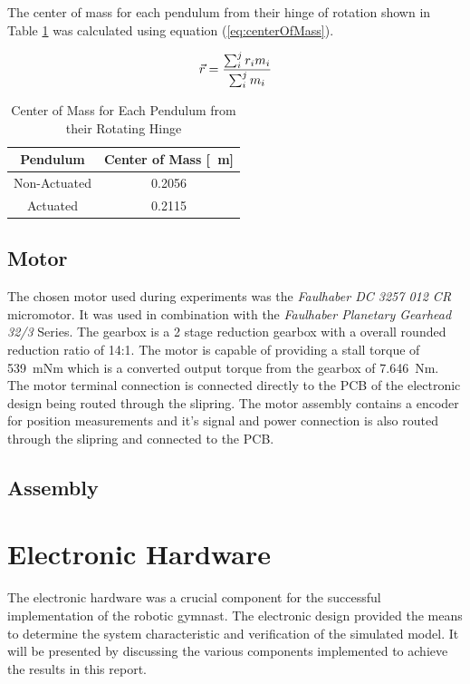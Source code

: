 The center of mass for each pendulum from their hinge of rotation shown in Table \ref{table:centerOfMass} was calculated using equation (\ref{eq:centerOfMass}).

\begin{equation} \label{eq:centerOfMass}
\vec{\boldmath{r}} = \frac{\sum_{i}^{j}r_{i}m_{i}}{\sum_{i}^{j}m_{i}}
\end{equation}

\begin{table}[]
	\centering
	\begin{tabular}{|c|c|}
		\hline
		Pendulum & Center of Mass [\SI{}{m}] \\
		\hline
		\hline
		Non-Actuated  & \SI{0.2056}{} \\
		\hline
		Actuated  & \SI{0.2115}{} \\
		\hline
	\end{tabular}
	\caption{Center of Mass for Each Pendulum from their Rotating Hinge}
	\label{table:centerOfMass}
\end{table}


\subsection{Motor}
The chosen motor used during experiments was the \textit{Faulhaber DC 3257 012 CR} micromotor. It was used in combination with the \textit{Faulhaber Planetary Gearhead 32/3} Series. The gearbox is a 2 stage reduction gearbox with a overall rounded reduction ratio of 14:1. The motor is capable of providing a stall torque of \SI{539}{mNm} which is a converted output torque from the gearbox of \SI{7.646}{Nm}.\\

The motor terminal connection is connected directly to the PCB of the electronic design being routed through the slipring. The motor assembly contains a encoder for position measurements and it's signal and power connection is also routed through the slipring and connected to the PCB.
\subsection{Assembly}



\section{Electronic Hardware}
The electronic hardware was a crucial component for the successful implementation of the robotic gymnast. The electronic design provided the means to determine the system characteristic and verification of the simulated model. It will be presented by discussing the various components implemented to achieve the results in this report.

